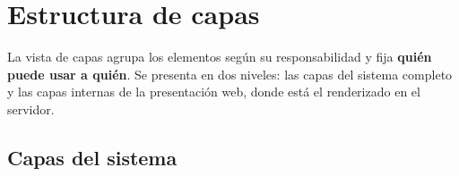 \seccionnueva
\section{Estructura de capas}
\label{sec:capas}

La vista de capas agrupa los elementos según su responsabilidad y fija \textbf{quién puede usar
a quién}. Se presenta en dos niveles: las capas del sistema completo y las capas internas de la
presentación web, donde está el renderizado en el servidor.

\subsection{Capas del sistema}

